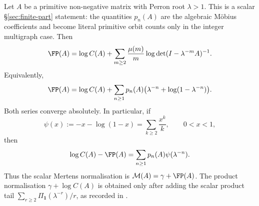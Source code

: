 \begin{lemma}
  \label{lem:finite-part-primitive-closed-form}
  Let \(A\) be a primitive non-negative matrix with Perron root
  \(\lambda>1\). This is a scalar \S\ref{sec:finite-part} statement: the
  quantities \(p_n(A)\) are the algebraic M\"obius coefficients and become
  literal primitive orbit counts only in the integer multigraph case. Then
  \begin{equation}\label{eq:finite-part-determinant-mobius}
    \FP(A)
    =
    \log C(A)
    +\sum_{m\ge 2}\frac{\mu(m)}{m}
      \log\det(I-\lambda^{-m}A)^{-1}.
  \end{equation}
  Equivalently,
  \begin{equation}\label{eq:finite-part-primitive-closed}
    \FP(A)
    =
    \log C(A)
    +\sum_{n\ge 1}p_n(A)
      \bigl(\lambda^{-n}+\log(1-\lambda^{-n})\bigr).
  \end{equation}
  Both series converge absolutely. In particular, if
  \[
    \psi(x):=-x-\log(1-x)=\sum_{k\ge 2}\frac{x^k}{k},
    \qquad 0<x<1,
  \]
  then
  \begin{equation}\label{eq:finite-part-gap-series}
    \log C(A)-\FP(A)
    =
    \sum_{n\ge 1}p_n(A)\psi(\lambda^{-n}).
  \end{equation}
  Thus the scalar Mertens normalisation is
  \(\mathcal M(A)=\gamma+\FP(A)\).  The product normalisation
  \(\gamma+\log C(A)\) is obtained only after adding the scalar product tail
  \(\sum_{r\ge2}\Pi_{\mathbf1}(\lambda^{-r})/r\), as recorded in
  .
\end{lemma}

